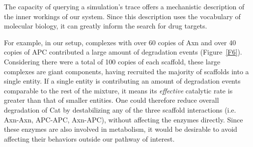 The capacity of querying a simulation's trace offers a mechanistic description of the inner workings of our system. Since this description uses the vocabulary of molecular biology, it can greatly inform the search for drug targets. 

For example, in our setup, complexes with over 60 copies of Axn and over 40 copies of APC contributed a large amount of degradation events (Figure~\ref{F6}). Considering there were a total of 100 copies of each scaffold, these large complexes are giant components, having recruited the majority of scaffolds into a single entity. If a single entity is contributing an amount of degradation events comparable to the rest of the mixture, it means its \emph{effective} catalytic rate is greater than that of smaller entities. One could therefore reduce overall degradation of Cat by destabilizing any of the three scaffold interactions (i.e. Axn-Axn, APC-APC, Axn-APC), without affecting the enzymes directly. Since these enzymes are also involved in metabolism, it would be desirable to avoid affecting their behaviors outside our pathway of interest.